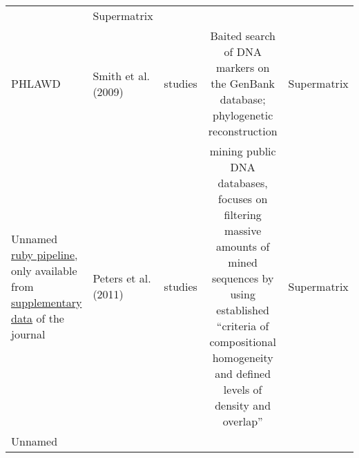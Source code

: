 \documentclass[draft]{ametsoc}
\begin{document}
\begin{longtable}[]{@{}llccc@{}}
\begin{minipage}[t]{0.20\columnwidth}
\end{minipage} & \begin{minipage}[t]{0.20\columnwidth}\centering
Supermatrix\strut
\end{minipage}\tabularnewline
\begin{minipage}[t]{0.12\columnwidth}\raggedright
PHLAWD\strut
\end{minipage} & \begin{minipage}[t]{0.15\columnwidth}\raggedright
Smith et al. (2009)\strut
\end{minipage} & \begin{minipage}[t]{0.20\columnwidth}\centering
234 studies\strut
\end{minipage} & \begin{minipage}[t]{0.20\columnwidth}\centering
Baited search of DNA markers on the GenBank database; phylogenetic
reconstruction\strut
\end{minipage} & \begin{minipage}[t]{0.20\columnwidth}\centering
Supermatrix\strut
\end{minipage}\tabularnewline
\begin{minipage}[t]{0.12\columnwidth}\raggedright
Unnamed
\href{https://www.zfmk.de/en/research/research-centres-and-groups/taming-of-an-impossible-child-pipeline-tools-and-manuals}{ruby
pipeline}, only available from
\href{https://static-content.springer.com/esm/art\%3A10.1186\%2F1741-7007-9-55/MediaObjects/12915_2011_480_MOESM1_ESM.ZIP}{supplementary
data} of the journal\strut
\end{minipage} & \begin{minipage}[t]{0.15\columnwidth}\raggedright
Peters et al. (2011)\strut
\end{minipage} & \begin{minipage}[t]{0.20\columnwidth}\centering
64 studies\strut
\end{minipage} & \begin{minipage}[t]{0.20\columnwidth}\centering
mining public DNA databases, focuses on filtering massive amounts of
mined sequences by using established ``criteria of compositional
homogeneity and defined levels of density and overlap''\strut
\end{minipage} & \begin{minipage}[t]{0.20\columnwidth}\centering
Supermatrix\strut
\end{minipage}\tabularnewline
\begin{minipage}[t]{0.12\columnwidth}\raggedright
Unnamed\strut
\end{minipage} & \begin{minipage}[t]{0.15\columnwidth}\raggedright

\end{minipage}
\end{longtable}
\end{document}
